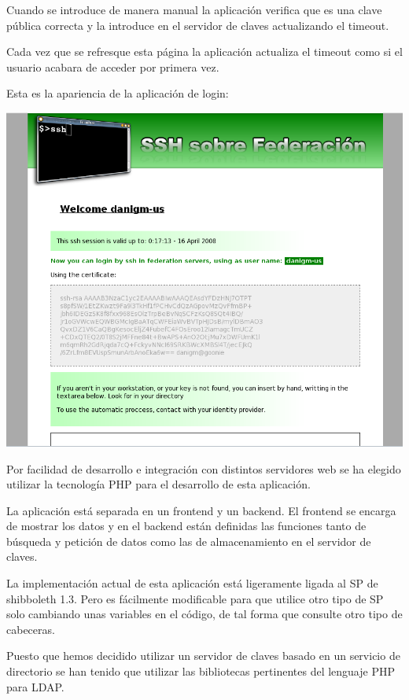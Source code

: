     Cuando se introduce de manera manual la aplicación verifica que es una
    clave pública correcta y la introduce en el servidor de claves
    actualizando el timeout.

    Cada vez que se refresque esta página la aplicación actualiza el
    timeout como si el usuario acabara de acceder por primera vez.

    Esta es la apariencia de la aplicación de login:
     
    \begin{center}
        \includegraphics[width=\textwidth]{img/sshApp.png}
    \end{center}
     
    Por facilidad de desarrollo e integración con distintos servidores
    web se ha elegido utilizar la tecnología PHP para el desarrollo de
    esta aplicación.

    La aplicación está separada en un frontend y un backend. El frontend se
    encarga de mostrar los datos y en el backend están definidas las
    funciones tanto de búsqueda y petición de datos como las de
    almacenamiento en el servidor de claves.

    La implementación actual de esta aplicación está ligeramente ligada al
    SP de shibboleth 1.3. Pero es fácilmente modificable para que utilice
    otro tipo de SP solo cambiando unas variables en el código, de tal
    forma que consulte otro tipo de cabeceras.

    Puesto que hemos decidido utilizar un servidor de claves basado en un
    servicio de directorio se han tenido que utilizar las bibliotecas
    pertinentes del lenguaje PHP para LDAP.

